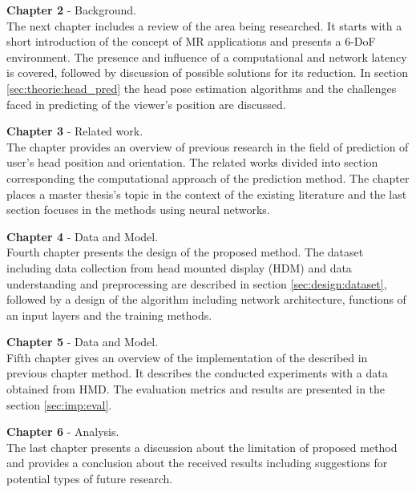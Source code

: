 \textbf{Chapter 2} - Background.\\
The next chapter includes a review of the area being researched. It starts with a short introduction of the concept of MR applications and presents a 6-DoF environment. The presence and influence of a computational and network latency is covered, followed by discussion of possible solutions for its reduction. In section \ref{sec:theorie:head_pred} the head pose estimation algorithms and the challenges faced in predicting of the viewer's position are discussed.

\textbf{Chapter 3} - Related work.\\
The chapter provides an overview of previous research in the field of prediction of user's head position and orientation. The related works divided into section corresponding the computational approach of the prediction method. The chapter places a master thesis's topic in the context of the existing literature and the last section focuses in the methods using neural networks. 

\textbf{Chapter 4} - Data and Model.\\
Fourth chapter presents the design of the proposed method. The dataset including data collection from head mounted display (HDM) and data understanding and preprocessing are described in section \ref{sec:design:dataset}, followed by a design of the algorithm including network architecture, functions of an input layers and the training methods.

\textbf{Chapter 5} - Data and Model.\\
Fifth chapter gives an overview of the implementation of the described in previous chapter method. It describes the conducted experiments with a data obtained from HMD. The evaluation metrics and results are presented in the section \ref*{sec:imp:eval}.

\textbf{Chapter 6} - Analysis.\\
The last chapter presents a discussion about the limitation of proposed method and provides a conclusion about the received results including suggestions for potential types of future research.